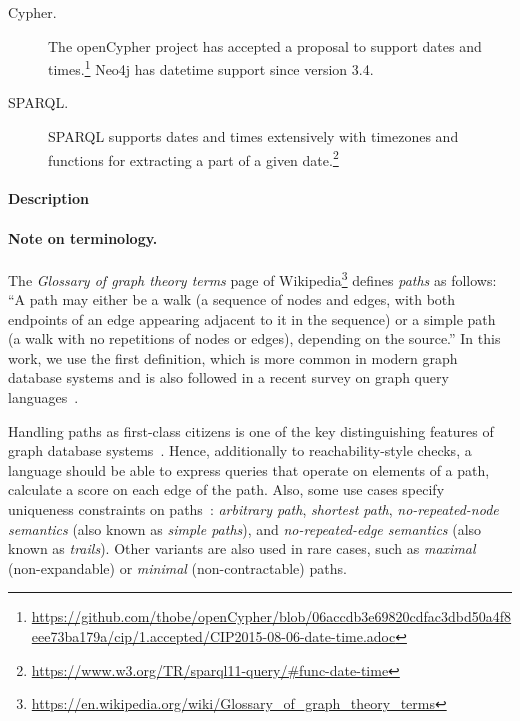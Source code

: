 \begin{description}
\item[Cypher.] The openCypher project has accepted a proposal to support dates and times.\footnote{\url{https://github.com/thobe/openCypher/blob/06accdb3e69820cdfac3dbd50a4f8eee73ba179a/cip/1.accepted/CIP2015-08-06-date-time.adoc}} Neo4j has datetime support since version 3.4.

\item[SPARQL.] SPARQL supports dates and times extensively with timezones and functions for extracting a part of a given date.\footnote{\url{https://www.w3.org/TR/sparql11-query/\#func-date-time}}
\end{description}





\paragraph{Description}

\paragraph{Note on terminology.} The \emph{Glossary of graph theory terms} page of Wikipedia\footnote{\url{https://en.wikipedia.org/wiki/Glossary_of_graph_theory_terms}} defines \emph{paths} as follows: ``A path may either be a walk (a sequence of nodes and edges, with both endpoints of an edge appearing adjacent to it in the sequence) or a simple path (a walk with no repetitions of nodes or edges), depending on the source.''
In this work, we use the first definition, which is more common in modern graph database systems and is also followed in a recent survey on graph query languages~\cite{DBLP:journals/csur/AnglesABHRV17}.

Handling paths as first-class citizens is one of the key distinguishing features of graph database 
systems~\cite{DBLP:conf/sigmod/AnglesABBFGLPPS18}. Hence, additionally to
reachability-style checks, a language should be able to express
queries that operate on elements of a path, \eg calculate a score on each edge
of the path.
Also, some use cases specify uniqueness constraints on paths~\cite{DBLP:journals/csur/AnglesABHRV17}:
\emph{arbitrary path},
\emph{shortest path},
\emph{no-repeated-node semantics} (also known as \emph{simple paths}), and
\emph{no-repeated-edge semantics} (also known as \emph{trails}).
Other variants are also used in rare cases, such as \emph{maximal} (non-expandable) or \emph{minimal} (non-contractable) paths.

